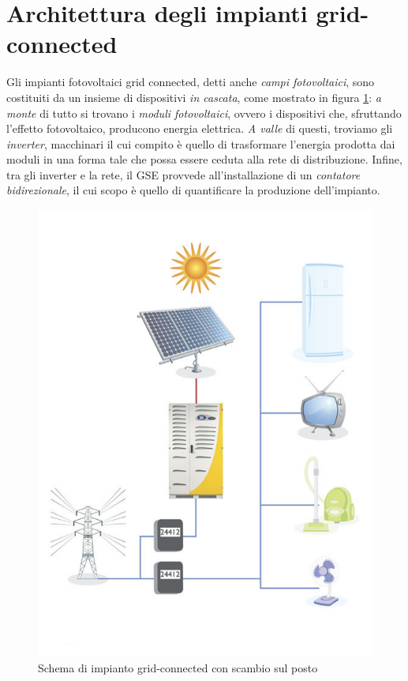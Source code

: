 %
\section{Architettura degli impianti grid-connected}
Gli impianti fotovoltaici grid connected, detti anche \emph{campi fotovoltaici}, 
sono costituiti da un insieme di dispositivi \emph{in cascata}, come mostrato in 
figura \ref{impiantogridconnect}: \emph{a monte} di tutto si trovano i \emph{moduli 
fotovoltaici}, ovvero i dispositivi che, sfruttando l'effetto fotovoltaico, 
producono energia elettrica. \emph{A valle} di questi, troviamo gli \emph{inverter}, 
macchinari il cui compito \`e quello di trasformare l'energia prodotta dai moduli 
in una forma tale che possa essere ceduta alla rete di distribuzione. Infine, tra 
gli inverter e la rete, il GSE provvede all'installazione di un \emph{contatore 
bidirezionale}, il cui scopo \`e quello di quantificare la produzione dell'impianto.
%
\begin{figure}[!h]
\centering
\includegraphics[width=350pt]{img/impianto-grid-connect.jpg}
\caption{Schema di impianto grid-connected con scambio sul posto}
\label{impiantogridconnect}
\end{figure}
%

